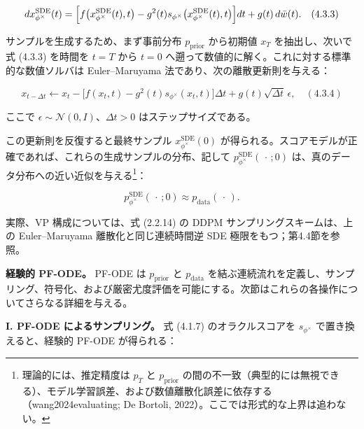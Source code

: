 \[
dx_{\phi^\times}^{\mathrm{SDE}}(t)
= \Bigl[f\bigl(x_{\phi^\times}^{\mathrm{SDE}}(t),t\bigr)
- g^2(t)s_{\phi^\times}\bigl(x_{\phi^\times}^{\mathrm{SDE}}(t),t\bigr)\Bigr]dt
+ g(t)\, d\bar{w}(t). \quad (4.3.3)
\]




サンプルを生成するため、まず事前分布 $p_{\mathrm{prior}}$ から初期値 $x_T$ を抽出し、次いで式 (4.3.3) を時間を $t=T$ から $t=0$ へ遡って数値的に解く。これに対する標準的な数値ソルバは Euler–Maruyama 法であり、次の離散更新則を与える：

\[
x_{t-\Delta t}
\leftarrow x_t
- \bigl[f(x_t,t)-g^2(t)s_{\phi^\times}(x_t,t)\bigr]\Delta t
+ g(t)\sqrt{\Delta t}\,\epsilon, \quad (4.3.4)
\]


ここで $\epsilon\sim\mathcal{N}(0,I)$、$\Delta t>0$ はステップサイズである。

この更新則を反復すると最終サンプル $x_{\phi^\times}^{\mathrm{SDE}}(0)$ が得られる。スコアモデルが正確であれば、これらの生成サンプルの分布、記して $p_{\phi^\times}^{\mathrm{SDE}}(\,\cdot\,;0)$ は、真のデータ分布への近い近似を与える\footnote{理論的には、推定精度は $p_T$ と $p_{\mathrm{prior}}$ の間の不一致（典型的には無視できる）、モデル学習誤差、および数値離散化誤差に依存する（wang2024evaluating; De Bortoli, 2022）。ここでは形式的な上界は追わない。}：

\[
p_{\phi^\times}^{\mathrm{SDE}}(\,\cdot\,;0)\approx p_{\mathrm{data}}(\,\cdot\,).
\]


実際、VP 構成については、式 (2.2.14) の DDPM サンプリングスキームは、上の Euler–Maruyama 離散化と同じ連続時間逆 SDE 極限をもつ；第4.4節を参照。

\textbf{経験的 PF-ODE。} PF-ODE は $p_{\mathrm{prior}}$ と $p_{\mathrm{data}}$ を結ぶ連続流れを定義し、サンプリング、符号化、および厳密尤度評価を可能にする。次節はこれらの各操作についてさらなる詳細を与える。

\textbf{I. PF-ODE によるサンプリング。} 式 (4.1.7) のオラクルスコアを $s_{\phi^\times}$ で置き換えると、経験的 PF-ODE が得られる：

